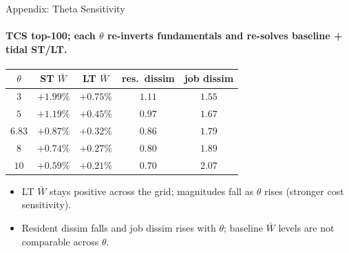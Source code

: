 \documentclass[11pt,aspectratio=169]{beamer}
\newcommand{\navback}[1]{\par\vspace{0.35em}\noindent\hfill\hyperlink{#1}{\beamerreturnbutton{back}}}
\begin{document}
\begin{frame}[label=appsens_theta]{Appendix: Theta Sensitivity}
\framesubtitle{TCS top-100; each $\theta$ re-inverts fundamentals and re-solves baseline + tidal ST/LT.}
\scriptsize
\begin{center}
\renewcommand{\arraystretch}{1.3}
\setlength{\tabcolsep}{12pt}
\begin{tabular}{ccccc}
\toprule
$\theta$ & ST $\bar W$ & LT $\bar W$ & res.\ dissim & job dissim \\
\midrule
$3$ & $+1.99\%$ & $+0.75\%$ & $1.11$ & $1.55$ \\
$5$ & $+1.19\%$ & $+0.45\%$ & $0.97$ & $1.67$ \\
$\mathbf{6.83}$ & $\mathbf{+0.87\%}$ & $\mathbf{+0.32\%}$ & $\mathbf{0.86}$ & $\mathbf{1.79}$ \\
$8$ & $+0.74\%$ & $+0.27\%$ & $0.80$ & $1.89$ \\
$10$ & $+0.59\%$ & $+0.21\%$ & $0.70$ & $2.07$ \\
\bottomrule
\end{tabular}
\end{center}
\vspace{0.4em}
\begin{itemize}\footnotesize
  \item LT $\bar W$ stays positive across the grid; magnitudes fall as $\theta$ rises (stronger cost sensitivity).
  \item Resident dissim falls and job dissim rises with $\theta$; baseline $\bar W$ levels are not comparable across $\theta$.
\end{itemize}
\navback{appsens}
\end{frame}
\end{document}
